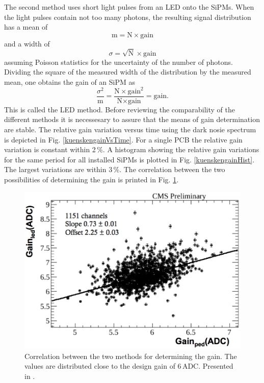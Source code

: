 The second method uses short light pulses from an LED onto the SiPMs. When the light pulses contain not too many photons, the resulting signal distribution has a mean of
\begin{equation}
\text{m}=\text{N}\times \text{gain}
\end{equation}
and a width of
\begin{equation}
\sigma=\sqrt{\text{N}}\times \text{gain}
\end{equation}
assuming Poisson statistics for the uncertainty of the number of photons. Dividing the square of the measured width of the distribution by the measured mean, one obtains the gain of an SiPM as
\begin{equation}
\frac{\sigma^2}{\text{m}}=\frac{\text{N}\times \text{gain}^2}{\text{N}\times \text{gain}}=\text{gain.}
\end{equation}
This is called the LED method.
Before reviewing the comparability of the different methods it is necessesary to assure that the means of gain determination are stable. The relative gain variation versus time using the dark nosie spectrum is depicted in Fig. \ref{kuenskengainVsTime}. For a single PCB the relative gain variation is constant within 2\,\%. A histogram showing the relative gain variations for the same period for all installed SiPMs is plotted in Fig. \ref{kuenskengainHist}. The largest variations are within 3\,\%. The correlation between the two possibilities of determining the gain is printed in Fig. \ref{kuenskengainCorr}.
\begin{figure}[b]
\centering
\begin{minipage}[b]{0.475\textwidth}
\includegraphics[width=\textwidth]{Figures/kuensken/gainCorrelation.png}
\end{minipage}
\hspace{0.5cm}
\begin{minipage}[b]{0.475\textwidth}
\caption{Correlation between the two methods for determining the gain. The values are distributed close to the design gain of 6\,ADC. Presented in \cite{kuenskenCalor}.}
\label{kuenskengainCorr}
\end{minipage}
\end{figure}
